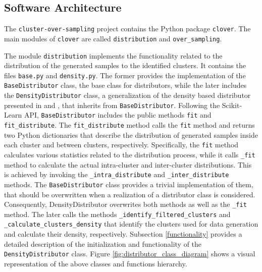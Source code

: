 \documentclass[preprint,12pt, a4paper]{elsarticle}
\begin{document}
\subsection{Software Architecture}
\label{architecture}

The \texttt{cluster-over-sampling} project contains the Python package \texttt{clover}. The main modules of \texttt{clover} are called \texttt{distribution} and \texttt{over\_sampling}. 

The module \texttt{distribution} implements the functionality related to the distribution of the generated samples to the identified clusters. It contains the files \texttt{base.py} and \texttt{density.py}. The former provides the implementation of the \texttt{BaseDistributor} class, the base class for distributors, while the later includes the \texttt{DensityDistributor} class, a generalization of the density based distributor presented in \cite{Douzas2017a} and \cite{Douzas2018}, that inherits from \texttt{BaseDistributor}. Following the Scikit-Learn API, \texttt{BaseDistributor} includes the public methods \texttt{fit} and \texttt{fit\_distribute}. The \texttt{fit\_distribute} method calls the \texttt{fit} method and returns two Python dictionaries that describe the distribution of generated samples inside each cluster and between clusters, respectively. Specifically, the \texttt{fit} method calculates various statistics related to the distribution process, while it calls \texttt{\_fit} method to calculate the actual intra-cluster and inter-cluster distributions. This is achieved by invoking the \texttt{\_intra\_distribute} and \texttt{\_inter\_distribute} methods. The \texttt{BaseDistributor} class provides a trivial implementation of them, that should be overwritten when a realization of a distributor class is considered. Consequently, \texttt{}{DensityDistributor} overwrites both methods as well as the \texttt{\_fit} method. The later calls the methods \texttt{\_identify\_filtered\_clusters} and \texttt{\_calculate\_clusters\_density} that identify the clusters used for data generation and calculate their density, respectively. Subsection \ref{functionality} provides a detailed description of the initialization and functionality of the \texttt{DensityDistributor} class. Figure \ref{fig:distributor_class_diagram} shows a visual representation of the above classes and functions hierarchy.
\end{document}
